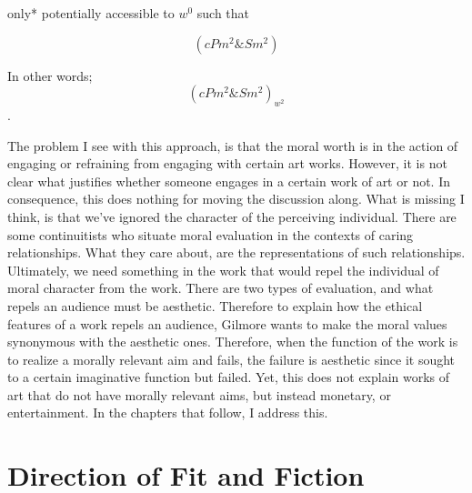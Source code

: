 \documentclass[
  letterpaper,
  DIV=11,
  numbers=noendperiod]{scrartcl}
\theoremstyle{remark}
\begin{document}
\noindent *only* potentially accessible to \(w^{0}\) such that

\[( cPm^{2} \& Sm^{2} )\]

\noindent In other words; \[( cPm^{2} \& Sm^{2} )_{w^{2}}\].

The problem I see with this approach, is that the moral worth is in the
action of engaging or refraining from engaging with certain art works.
However, it is not clear what justifies whether someone engages in a
certain work of art or not. In consequence, this does nothing for moving
the discussion along. What is missing I think, is that we've ignored the
character of the perceiving individual. There are some continuitists who
situate moral evaluation in the contexts of caring relationships. What
they care about, are the representations of such relationships.
Ultimately, we need something in the work that would repel the
individual of moral character from the work. There are two types of
evaluation, and what repels an audience must be aesthetic. Therefore to
explain how the ethical features of a work repels an audience, Gilmore
wants to make the moral values synonymous with the aesthetic ones.
Therefore, when the function of the work is to realize a morally
relevant aim and fails, the failure is aesthetic since it sought to a
certain imaginative function but failed. Yet, this does not explain
works of art that do not have morally relevant aims, but instead
monetary, or entertainment. In the chapters that follow, I address this.

\newpage

\section{Direction of Fit and
Fiction}\label{direction-of-fit-and-fiction}
\end{document}
